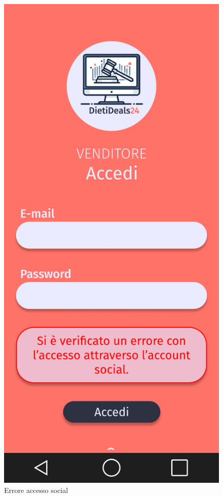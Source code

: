 \begin{figure}[!htb]
\begin{minipage}{0.32\textwidth}
            \includegraphics[width=.7\linewidth]{Immagini/Frames/Errori/E2.pdf}
            \caption{Errore accesso social}
        \end{minipage}\hfill
    \end{figure}
    
